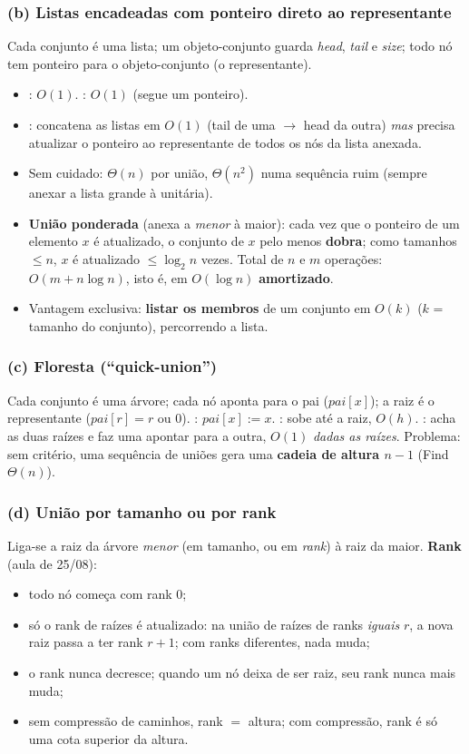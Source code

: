 \subsubsection*{(b) Listas encadeadas com ponteiro direto ao representante}
Cada conjunto é uma lista; um objeto-conjunto guarda \emph{head}, \emph{tail} e \emph{size}; todo nó tem ponteiro para o objeto-conjunto (o representante).
\begin{itemize}
  \item \MakeSet: $O(1)$. \Find: $O(1)$ (segue um ponteiro).
  \item \Union: concatena as listas em $O(1)$ (tail de uma $\to$ head da outra) \emph{mas} precisa atualizar o ponteiro ao representante de todos os nós da lista anexada.
  \item Sem cuidado: $\Theta(n)$ por união, $\Theta(n^2)$ numa sequência ruim (sempre anexar a lista grande à unitária).
  \item \textbf{União ponderada} (anexa a \emph{menor} à maior): cada vez que o ponteiro de um elemento $x$ é atualizado, o conjunto de $x$ pelo menos \textbf{dobra}; como tamanhos $\le n$, $x$ é atualizado $\le\log_2 n$ vezes. Total de $n$ \MakeSet{} e $m$ operações: $O(m+n\log n)$, isto é, \Union{} em $O(\log n)$ \textbf{amortizado}.
  \item Vantagem exclusiva: \textbf{listar os membros} de um conjunto em $O(k)$ ($k$ = tamanho do conjunto), percorrendo a lista.
\end{itemize}

\subsubsection*{(c) Floresta (``quick-union'')}
Cada conjunto é uma árvore; cada nó aponta para o pai ($pai[x]$); a raiz é o representante ($pai[r]=r$ ou $0$). \MakeSet: $pai[x]:=x$. \Find: sobe até a raiz, $O(h)$. \Union: acha as duas raízes e faz uma apontar para a outra, $O(1)$ \emph{dadas as raízes}.
Problema: sem critério, uma sequência de uniões gera uma \textbf{cadeia de altura $n-1$} (Find $\Theta(n)$).

\subsubsection*{(d) União por tamanho ou por rank}
Liga-se a raiz da árvore \emph{menor} (em tamanho, ou em \emph{rank}) à raiz da maior. \textbf{Rank} (aula de 25/08):
\begin{itemize}
  \item todo nó começa com rank 0;
  \item só o rank de raízes é atualizado: na união de raízes de ranks \emph{iguais} $r$, a nova raiz passa a ter rank $r+1$; com ranks diferentes, nada muda;
  \item o rank nunca decresce; quando um nó deixa de ser raiz, seu rank nunca mais muda;
  \item sem compressão de caminhos, rank $=$ altura; com compressão, rank é só uma cota superior da altura.
\end{itemize}

